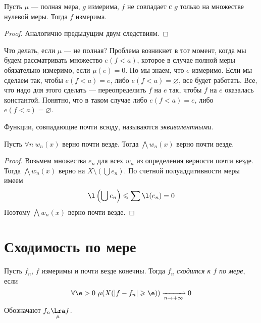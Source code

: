 \begin{corollary}
	Пусть $\mu$ --- полная мера, $g$ измерима, $f$ не совпадает с 
	$g$ только на множестве нулевой меры. Тогда $f$ измерима.
\end{corollary}
\begin{proof}
	Аналогично предыдущим двум следствиям.
\end{proof}

\begin{remark}
	Что делать, если $\mu$ --- не полная? Проблема возникнет в тот момент, 
	когда мы будем рассматривать множество $e(f < a)$, которое в случае
	полной меры обязательно измеримо, если $\mu(e) = 0$. Но мы знаем,
	что $e$ измеримо. Если мы сделаем так, чтобы $e(f < a) = e$, либо $e(f < a) = 
	\varnothing$, все будет работать. Все, что надо для этого сделать --- 
	переопределить $f$ на $e$ так, чтобы $f$ на $e$ оказалась константой.
	Понятно, что в таком случае либо $e(f < a) = e$, либо $e(f < a) = \varnothing$.
\end{remark}

\begin{definition}
	Функции, совпадающие почти всюду, называются \textit{эквивалентными}.
\end{definition}

\begin{theorem}
	Пусть $\forall n~ w_n(x)$ верно почти везде. Тогда 
	$\bigwedge{w_n(x)}$ верно почти везде.
\end{theorem}
\begin{proof}
	Возьмем множества $e_n$ для всех $w_n$ из определения верности почти везде.
	Тогда $\bigwedge{w_n(x)}$ верно на $\displaystyle X \setminus 
	\left(\bigcup{e_n}\right)$. По счетной полуаддитивности меры имеем
\[
	\l\left(\bigcup{e_n}\right) \leqslant \sum{\l(e_n)} = 0
\]
	Поэтому $\bigwedge{w_n(x)}$ верно почти везде.
\end{proof}

\section{Сходимость по мере}

\begin{definition}
	Пусть $f_n$, $f$ измеримы и почти везде конечны. Тогда 
	$f_n$ \textit{сходится к $f$ по мере}, если
\[
	\forall \e > 0~ \mu(X(|f - f_n| \geqslant \e)) \xrightarrow[n \to +\infty]{} 0
\]
	Обозначают $f_n \underset{\mu}{\Lra} f$.
\end{definition}

